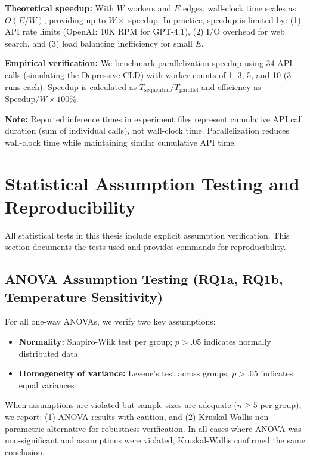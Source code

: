 \textbf{Theoretical speedup:} With $W$ workers and $E$ edges, wall-clock time scales as $O(E/W)$, providing up to $W\times$ speedup. In practice, speedup is limited by: (1) API rate limits (OpenAI: 10K RPM for GPT-4.1), (2) I/O overhead for web search, and (3) load balancing inefficiency for small $E$.

\textbf{Empirical verification:} We benchmark parallelization speedup using 34 API calls (simulating the Depressive CLD) with worker counts of 1, 3, 5, and 10 (3 runs each). Speedup is calculated as $T_{\text{sequential}} / T_{\text{parallel}}$ and efficiency as $\text{Speedup} / W \times 100\%$.

\textbf{Note:} Reported inference times in experiment files represent cumulative API call duration (sum of individual calls), not wall-clock time. Parallelization reduces wall-clock time while maintaining similar cumulative API time.

\section{Statistical Assumption Testing and Reproducibility}
\label{sec:assumption_testing}

All statistical tests in this thesis include explicit assumption verification. This section documents the tests used and provides commands for reproducibility.

\subsection{ANOVA Assumption Testing (RQ1a, RQ1b, Temperature Sensitivity)}

For all one-way ANOVAs, we verify two key assumptions:
\begin{itemize}[noitemsep]
    \item \textbf{Normality:} Shapiro-Wilk test per group; $p > .05$ indicates normally distributed data
    \item \textbf{Homogeneity of variance:} Levene's test across groups; $p > .05$ indicates equal variances
\end{itemize}

When assumptions are violated but sample sizes are adequate ($n \geq 5$ per group), we report: (1) ANOVA results with caution, and (2) Kruskal-Wallis non-parametric alternative for robustness verification. In all cases where ANOVA was non-significant and assumptions were violated, Kruskal-Wallis confirmed the same conclusion.


